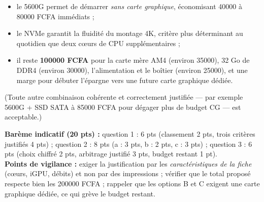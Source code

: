 \documentclass[11pt]{article}
\begin{document}
\begin{corrige}
\begin{enumerate}
\begin{itemize}
        \item le 5600G permet de démarrer \emph{sans carte graphique}, économisant \num{40000} à \num{80000} FCFA immédiats ;
        \item le NVMe garantit la fluidité du montage 4K, critère plus déterminant au quotidien que deux cœurs de CPU supplémentaires ;
        \item il reste \textbf{\num{100000} FCFA} pour la carte mère AM4 (environ \num{35000}), 32 Go de DDR4 (environ \num{30000}), l'alimentation et le boîtier (environ \num{25000}), et une marge pour débuter l'épargne vers une future carte graphique dédiée.
    \end{itemize}
    (Toute autre combinaison cohérente et correctement justifiée — par exemple 5600G + SSD SATA à \num{85000} FCFA pour dégager plus de budget CG — est acceptable.)
\end{enumerate}
\textbf{Barème indicatif (20 pts) :} question 1 : 6 pts (classement 2 pts, trois critères justifiés 4 pts) ; question 2 : 8 pts (a : 3 pts, b : 2 pts, c : 3 pts) ; question 3 : 6 pts (choix chiffré 2 pts, arbitrage justifié 3 pts, budget restant 1 pt).\\
\textbf{Points de vigilance :} exiger la justification par les \emph{caractéristiques de la fiche} (cœurs, iGPU, débits) et non par des impressions ; vérifier que le total proposé respecte bien les \num{200000} FCFA ; rappeler que les options B et C exigent une carte graphique dédiée, ce qui grève le budget restant.
\end{corrige}
\end{document}
